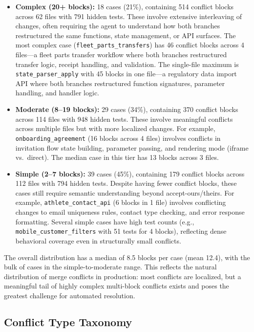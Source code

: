 \documentclass[11pt,a4paper]{article}
\begin{document}
\begin{itemize}[leftmargin=2em]
\item \textbf{Complex (20+ blocks):} 18 cases (21\%), containing 514 conflict blocks across 62 files with 791 hidden tests. These involve extensive interleaving of changes, often requiring the agent to understand how both branches restructured the same functions, state management, or API surfaces. The most complex case (\texttt{fleet\_parts\_transfers}) has 46 conflict blocks across 4 files---a fleet parts transfer workflow where both branches restructured transfer logic, receipt handling, and validation. The single-file maximum is \texttt{state\_parser\_apply} with 45 blocks in one file---a regulatory data import API where both branches restructured function signatures, parameter handling, and handler logic.

\item \textbf{Moderate (8--19 blocks):} 29 cases (34\%), containing 370 conflict blocks across 114 files with 948 hidden tests. These involve meaningful conflicts across multiple files but with more localized changes. For example, \texttt{onboarding\_agreement} (16 blocks across 4 files) involves conflicts in invitation flow state building, parameter passing, and rendering mode (iframe vs.\ direct). The median case in this tier has 13 blocks across 3 files.

\item \textbf{Simple (2--7 blocks):} 39 cases (45\%), containing 179 conflict blocks across 112 files with 794 hidden tests. Despite having fewer conflict blocks, these cases still require semantic understanding beyond accept-ours/theirs. For example, \texttt{athlete\_contact\_api} (6 blocks in 1 file) involves conflicting changes to email uniqueness rules, contact type checking, and error response formatting. Several simple cases have high test counts (e.g., \texttt{mobile\_customer\_filters} with 51 tests for 4 blocks), reflecting dense behavioral coverage even in structurally small conflicts.
\end{itemize}

The overall distribution has a median of 8.5 blocks per case (mean 12.4), with the bulk of cases in the simple-to-moderate range. This reflects the natural distribution of merge conflicts in production: most conflicts are localized, but a meaningful tail of highly complex multi-block conflicts exists and poses the greatest challenge for automated resolution.

\subsection{Conflict Type Taxonomy}
\end{document}
